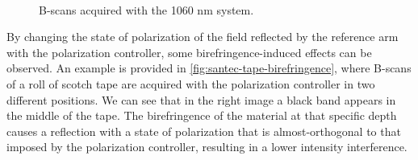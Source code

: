 \begin{figure}[H]
	\myfloatalign
	 \quad
	 \\
	\caption{B-scans acquired with the 1060 nm system.}\label{fig:santec-bscans}
\end{figure}

By changing the state of polarization of the field reflected by the reference arm with the polarization controller, some birefringence-induced effects can be observed. An example is provided in \autoref{fig:santec-tape-birefringence}, where B-scans of a roll of scotch tape are acquired with the polarization controller in two different positions. We can see that in the right image a black band appears in the middle of the tape. The birefringence of the material at that specific depth causes a reflection with a state of polarization that is almost-orthogonal to that imposed by the polarization controller, resulting in a lower intensity interference. 

